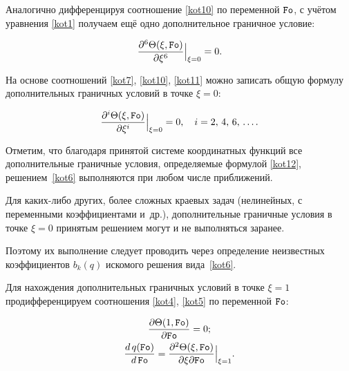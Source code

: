 Аналогично дифференцируя соотношение \eqref{kot10} по переменной $\mbox{\tt Fo}$, с учётом уравнения \eqref{kot1} получаем ещё одно дополнительное граничное условие:

\begin{equation}

\label{kot11}

\frac{\partial^6\Theta(\xi,\mbox{\tt Fo})}{\partial\xi^6}\Bigr|_{\xi=0}=0.

\end{equation}



На основе соотношений \eqref{kot7}, \eqref{kot10}, \eqref{kot11} можно записать общую формулу дополнительных граничных условий в точке $\xi= 0$:

\begin{equation}

\label{kot12}

\frac{\partial^i\Theta(\xi,\mbox{\tt Fo})}{\partial\xi^i}\Bigr|_{\xi=0}=0, \quad i=2,\,4,\,6,\,\dots.

\end{equation}



Отметим, что благодаря принятой системе координатных функций все дополнительные граничные условия, определяемые формулой \eqref{kot12}, решением~\eqref{kot6} выполняются при любом числе приближений.

Для каких-либо других, более сложных краевых задач (нелинейных, с переменными коэффициентами и~др.), дополнительные граничные условия в точке $\xi=0$ принятым решением могут и не выполняться заранее.

Поэтому их выполнение следует проводить через определение неизвестных коэффициентов $b_k(q)$ искомого решения вида~\eqref{kot6}.



Для нахождения дополнительных граничных условий в точке $\xi=1$ продифференцируем соотношения \eqref{kot4}, \eqref{kot5} по переменной $\mbox{\tt Fo}$:

\begin{gather}

\label{kot13}

\frac{\partial\Theta(1,\mbox{\tt Fo})}{\partial\mbox{\tt Fo}}=0;

\\

\label{kot14}

\frac{d\,q(\mbox{\tt Fo})}{d\,\mbox{\tt Fo}}=\frac{\partial^2\Theta(\xi,\mbox{\tt Fo})}{\partial\xi\partial\mbox{\tt Fo}}\Big|_{\xi=1}.

\end{gather}



